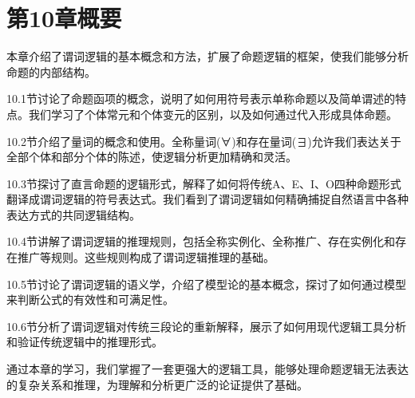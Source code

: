 \section{第10章概要}
本章介绍了谓词逻辑的基本概念和方法，扩展了命题逻辑的框架，使我们能够分析命题的内部结构。

10.1节讨论了命题函项的概念，说明了如何用符号表示单称命题以及简单谓述的特点。我们学习了个体常元和个体变元的区别，以及如何通过代入形成具体命题。

10.2节介绍了量词的概念和使用。全称量词(∀)和存在量词(∃)允许我们表达关于全部个体和部分个体的陈述，使逻辑分析更加精确和灵活。

10.3节探讨了直言命题的逻辑形式，解释了如何将传统A、E、I、O四种命题形式翻译成谓词逻辑的符号表达式。我们看到了谓词逻辑如何精确捕捉自然语言中各种表达方式的共同逻辑结构。

10.4节讲解了谓词逻辑的推理规则，包括全称实例化、全称推广、存在实例化和存在推广等规则。这些规则构成了谓词逻辑推理的基础。

10.5节讨论了谓词逻辑的语义学，介绍了模型论的基本概念，探讨了如何通过模型来判断公式的有效性和可满足性。

10.6节分析了谓词逻辑对传统三段论的重新解释，展示了如何用现代逻辑工具分析和验证传统逻辑中的推理形式。

通过本章的学习，我们掌握了一套更强大的逻辑工具，能够处理命题逻辑无法表达的复杂关系和推理，为理解和分析更广泛的论证提供了基础。

\printbibliography[heading=subbibliography,title={第10章参考文献}] 